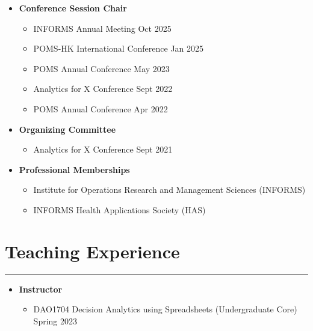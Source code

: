\documentclass[12pt, a4paper]{article}
\begin{document}
{\begin{itemize}[leftmargin=16pt]
	\item[] \textbf{Conference Session Chair}
	\begin{itemize}[parsep=2pt, label=$\bullet$]
		\item INFORMS Annual Meeting \hfill Oct 2025
		\item POMS-HK International Conference \hfill Jan 2025
		\item POMS Annual Conference \hfill May 2023
		\item Analytics for X Conference \hfill Sept 2022
		\item POMS Annual Conference \hfill Apr 2022
	\end{itemize}

	\item[] \textbf{Organizing Committee}
	\begin{itemize}[parsep=2pt, label=$\bullet$]
		\item Analytics for X Conference \hfill Sept 2021
	\end{itemize}

	\item[] \textbf{Professional Memberships}
	\begin{itemize}[parsep=2pt, label=$\bullet$]
		\item Institute for Operations Research and Management Sciences (INFORMS)
		\item INFORMS Health Applications Society (HAS)
	\end{itemize}

\end{itemize}




\section*{Teaching Experience}
\vspace*{4pt}
\hrule

\begin{itemize}[leftmargin=16pt]
	\item[] \textbf{Instructor}
	\begin{itemize}[label=$\bullet$]
		\item DAO1704 Decision Analytics using Spreadsheets (Undergraduate Core) \hfill Spring 2023
	\end{itemize}


\end{itemize}}
\end{document}
